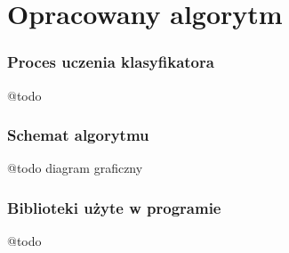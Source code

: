 %



\chapter{Opracowany algorytm}

\subsection{Proces uczenia klasyfikatora}
@todo

\subsection{Schemat algorytmu}
@todo
diagram graficzny

\subsection{Biblioteki użyte w programie}
@todo
